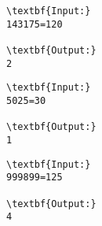 \begin{verbatim}
\textbf{Input:}
143175=120

\textbf{Output:}
2
\end{verbatim}
\begin{verbatim}
\textbf{Input:}
5025=30

\textbf{Output:}
1
\end{verbatim}
\begin{verbatim}
\textbf{Input:}
999899=125

\textbf{Output:}
4
\end{verbatim}